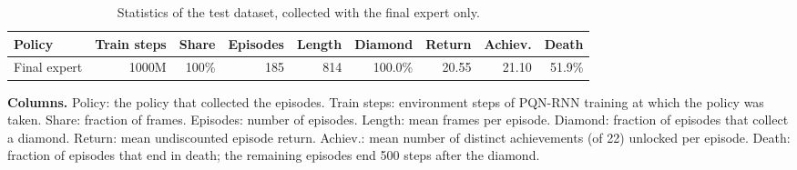\begin{table}[H]
\centering
\caption{Statistics of the test dataset, collected with the final expert only.}
\label{tab:data-test}
\small
\setlength{\tabcolsep}{3.5pt}
\begin{tabular}{lrrrrrrrr}
\toprule
Policy & Train steps & Share & Episodes & Length & Diamond & Return & Achiev. & Death \\
\midrule
Final expert & 1000M & 100\% & 185 & 814 & 100.0\% & 20.55 & 21.10 & 51.9\% \\
\bottomrule
\end{tabular}

\vspace{4pt}
\begin{minipage}{\linewidth}
\footnotesize\raggedright
\textbf{Columns.} Policy: the policy that collected the episodes. Train steps: environment steps of PQN-RNN training at which the policy was taken. Share: fraction of frames. Episodes: number of episodes. Length: mean frames per episode. Diamond: fraction of episodes that collect a diamond. Return: mean undiscounted episode return. Achiev.: mean number of distinct achievements (of 22) unlocked per episode. Death: fraction of episodes that end in death; the remaining episodes end 500 steps after the diamond.
\end{minipage}
\end{table}
